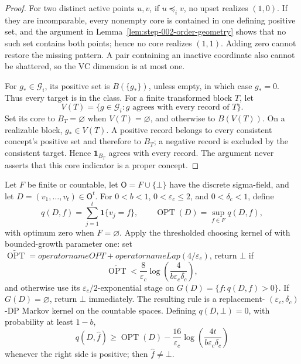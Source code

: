 \begin{proof}
For two distinct active points \(u,v\), if \(u\preceq_i v\), no upset
realizes \((1,0)\).  If they are incomparable, every nonempty core is
contained in one defining positive set, and the argument in
Lemma~\ref{lem:step-002-order-geometry} shows that no such set contains both
points; hence no core realizes \((1,1)\).  Adding zero cannot restore the
missing pattern.  A pair containing an inactive coordinate also cannot be
shattered, so the VC dimension is at most one.

For \(g_*\in\mathcal G_i\), its positive set is \(B(\{g_*\})\), unless
empty, in which case \(g_*=0\).  Thus every target is in the class.  For a
finite transformed block \(T\), let
\begin{equation}\label{eq:step-002-version-space}
V(T)=\{g\in\mathcal G_i:g\text{ agrees with every record of }T\}.
\end{equation}
Set its core to \(B_T=\varnothing\) when \(V(T)=\varnothing\), and otherwise
to \(B(V(T))\).  On a realizable block, \(g_*\in V(T)\).  A positive record
belongs to every consistent concept's positive set and therefore to
\(B_T\); a negative record is excluded by the consistent target.  Hence
\(\mathbf1_{B_T}\) agrees with every record.  The argument never asserts
that this core indicator is a proper concept.
\end{proof}

\begin{lemma}
\label{lem:step-002-countable-choosing}
Let \(F\) be finite or countable, let
\(\mathsf O=F\cup\{\bot\}\) have the discrete sigma-field, and let
\(D=(v_1,\ldots,v_t)\in\mathsf O^t\).  For
\(0<b<1\), \(0<\varepsilon_c\le2\), and \(0<\delta_c<1\), define
\[
q(D,f)=\sum_{j=1}^t\mathbf1\{v_j=f\},\qquad
\operatorname{OPT}(D)=\sup_{f\in F}q(D,f),
\]
with optimum zero when \(F=\varnothing\).  Apply the thresholded choosing
kernel of \citet{bunNissimStemmerVadhan2015} with bounded-growth parameter
one: set
\(\widetilde{\operatorname{OPT}}=operatorname{OPT}+operatorname{Lap}(4/\varepsilon_c)\),
return \(\bot\) if
\[
\widetilde{\operatorname{OPT}}
<\frac8{\varepsilon_c}
\log\!\left(\frac4{b\varepsilon_c\delta_c}\right),
\]
and otherwise use its \(\varepsilon_c/2\)-exponential stage on
\(G(D)=\{f:q(D,f)>0\}\).  If \(G(D)=\varnothing\), return \(\bot\)
immediately.  The resulting rule is a replacement-
\((\varepsilon_c,\delta_c)\)-DP Markov kernel on the countable spaces.
Defining \(q(D,\bot)=0\), with probability at least \(1-b\),
\begin{equation}\label{eq:step-002-choosing-utility}
q(D,\hat f)\ge \operatorname{OPT}(D)
-\frac{16}{\varepsilon_c}
\log\!\left(\frac{4t}{b\varepsilon_c\delta_c}\right)
\end{equation}
whenever the right side is positive; then \(\hat f\ne\bot\).
\end{lemma}

